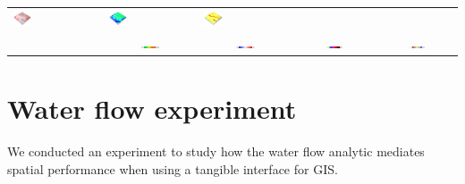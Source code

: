 \documentclass[prodmode,acmtochi]{acmsmall} %
\begin{document}
\begin{table}
{\begin{tabular}{m{} m{} m{} m{} m{}}
\includegraphics[width=0.22\textwidth]{images/render_3d/mean_dem_difference_4.png} &
\includegraphics[width=0.22\textwidth]{images/render_3d/mean_slope_4.png} &
\includegraphics[width=0.22\textwidth]{images/render_3d/mean_forms_4.png}\\
%
&
\multicolumn{1}{c}{\includegraphics[width=0.22\textwidth]{images/legends/elevation_legend_4.pdf}} &
\multicolumn{1}{c}{\includegraphics[width=0.22\textwidth]{images/legends/diff_legend.pdf}} &
\multicolumn{1}{c}{\includegraphics[width=0.22\textwidth]{images/legends/slope_legend.pdf}} &
\multicolumn{1}{c}{\includegraphics[width=0.22\textwidth]{images/legends/forms_legend.pdf}}\\
%
\bottomrule
\end{tabular}}
\label{table:difference_experiment} 
\end{table}

\section{Water flow experiment}
We conducted an experiment to study 
how the water flow analytic mediates spatial performance 
when using a tangible interface for GIS.
\end{document}
